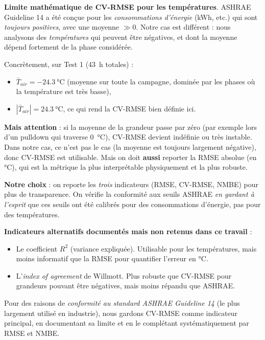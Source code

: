 \documentclass[11pt,a4paper]{article}
\begin{document}
\begin{honnete}
\textbf{Limite mathématique de CV-RMSE pour les températures}.
ASHRAE Guideline 14 a été conçue pour les \emph{consommations d'énergie} (kWh, etc.) qui
sont \emph{toujours positives}, avec une moyenne $\gg 0$. Notre cas est différent : nous
analysons des \emph{températures} qui peuvent être négatives, et dont la moyenne dépend
fortement de la phase considérée.

Concrètement, sur Test 1 (\SI{43}{\hour} totales) :
\begin{itemize}[itemsep=0pt]
\item $\bar T_{air} = -\SI{24,3}{\celsius}$ (moyenne sur toute la campagne, dominée par
les phases où la température est très basse),
\item $|\bar T_{air}| = \SI{24,3}{\celsius}$, ce qui rend la CV-RMSE bien définie ici.
\end{itemize}

\textbf{Mais attention} : si la moyenne de la grandeur passe par zéro (par exemple lors
d'un pulldown qui traverse \SI{0}{\celsius}), CV-RMSE devient indéfinie ou très instable.
Dans notre cas, ce n'est pas le cas (la moyenne est toujours largement négative), donc
CV-RMSE est utilisable. Mais on doit \textbf{aussi} reporter la RMSE absolue (en
\si{\celsius}), qui est la métrique la plus interprétable physiquement et la plus robuste.

\textbf{Notre choix} : on reporte les \emph{trois} indicateurs (RMSE, CV-RMSE, NMBE) pour
plus de transparence. On vérifie la conformité aux seuils ASHRAE \emph{en gardant à
l'esprit} que ces seuils ont été calibrés pour des consommations d'énergie, pas pour
des températures.
\end{honnete}

\textbf{Indicateurs alternatifs documentés mais non retenus dans ce travail} :
\begin{itemize}[itemsep=2pt]
\item Le coefficient $R^2$ (variance expliquée). Utilisable pour les températures, mais
moins informatif que la RMSE pour quantifier l'erreur en \si{\celsius}.
\item L'\emph{index of agreement} de Willmott. Plus robuste que CV-RMSE pour grandeurs
pouvant être négatives, mais moins répandu que ASHRAE.
\end{itemize}

Pour des raisons de \emph{conformité au standard ASHRAE Guideline 14} (le plus largement
utilisé en industrie), nous gardons CV-RMSE comme indicateur principal, en documentant
sa limite et en le complétant systématiquement par RMSE et NMBE.
\end{document}
